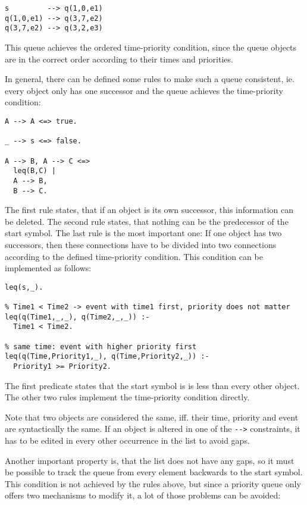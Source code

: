 \begin{lstlisting}
s         --> q(1,0,e1)
q(1,0,e1) --> q(3,7,e2)
q(3,7,e2) --> q(3,2,e3)
\end{lstlisting}

This queue achieves the ordered time-priority condition, since the queue objects are in the correct order according to their times and priorities.

In general, there can be defined some rules to make such a queue consistent, ie. every object only has one successor and the queue achieves the time-priority condition:

\begin{lstlisting}
A --> A <=> true.

_ --> s <=> false.

A --> B, A --> C <=>
  leq(B,C) |
  A --> B,
  B --> C.
\end{lstlisting}

The first rule states, that if an object is its own successor, this information can be deleted. The second rule states, that nothing can be the predecessor of the start symbol. The last rule is the most important one: If one object has two successors, then these connections have to be divided into two connections according to the defined time-priority condition. This condition can be implemented as follows:

\begin{lstlisting}
leq(s,_).

% Time1 < Time2 -> event with time1 first, priority does not matter
leq(q(Time1,_,_), q(Time2,_,_)) :- 
  Time1 < Time2.

% same time: event with higher priority first
leq(q(Time,Priority1,_), q(Time,Priority2,_)) :- 
  Priority1 >= Priority2.
\end{lstlisting}

The first predicate states that the start symbol is is less than every other object. The other two rules implement the time-priority condition directly.

Note that two objects are considered the same, iff. their time, priority and event are syntactically the same. If an object is altered in one of the \verb|-->| constraints, it has to be edited in every other occurrence in the   list to avoid gaps.

Another important property is, that the list does not have any gaps, so it must be possible to track the queue from every element backwards to the start symbol. This condition is not achieved by the rules above, but since a priority queue only offers two mechanisms to modify it, a lot of those problems can be avoided:

